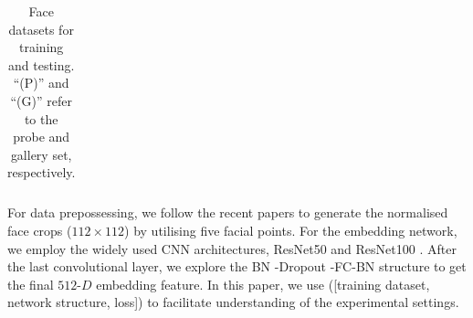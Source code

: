 \documentclass[10pt,twocolumn,letterpaper]{article}
\begin{document}
\begin{table}[t!]
\begin{center}
\begin{tabular}{c|c|c}
\hline
\end{tabular}
\end{center}
\caption{Face datasets for training and testing. ``(P)'' and ``(G)'' refer to the probe and gallery set, respectively.}
\label{table:dataset}
\vspace{-4mm}
\end{table}


 For data prepossessing, we follow the recent papers \cite{liu2017sphereface,tencent2017CosineFace} to generate the normalised face crops ($112\times112$) by utilising five facial points. For the embedding network, we employ the widely used CNN architectures, ResNet50 and ResNet100 \cite{he2016deep,han2016deep}. After the last convolutional layer, we explore the BN \cite{ioffe2015batch}-Dropout \cite{srivastava2014dropout}-FC-BN structure to get the final $512$-$D$ embedding feature. 
In this paper, we use ([training dataset, network structure, loss]) to facilitate understanding of the experimental settings. 
\end{document}
